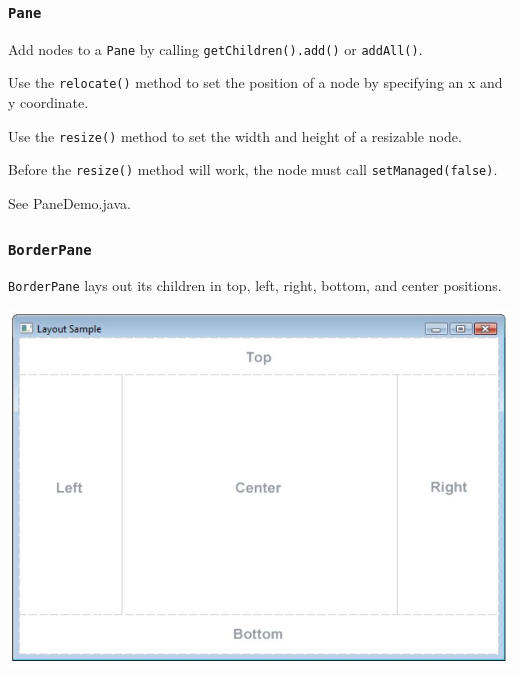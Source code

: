 \documentclass{beamer}
\newcommand{\mil}[1]{\texttt{#1}}
\begin{document}
\begin{frame}

    \frametitle{\mil{Pane}}
    
    Add nodes to a \mil{Pane} by calling \mil{getChildren().add()} or \mil{addAll()}.
    
    \bigskip
    
    Use the \mil{relocate()} method to set the position of a node by specifying an x and y coordinate.
    
    \bigskip
    
    Use the \mil{resize()} method to set the width and height of a resizable node.
    
    \bigskip
    
    Before the \mil{resize()} method will work, the node must call \mil{setManaged(false)}.
    
    \bigskip
    
    See PaneDemo.java.
\end{frame}

\begin{frame}
    
    \frametitle{\mil{BorderPane}}
    
    \mil{BorderPane} lays out its children in top, left, right, bottom, and center positions.
    
    \begin{center}
        \includegraphics[scale=0.4]{borderpane.jpg}
    \end{center}
        
\end{frame}
\end{document}
